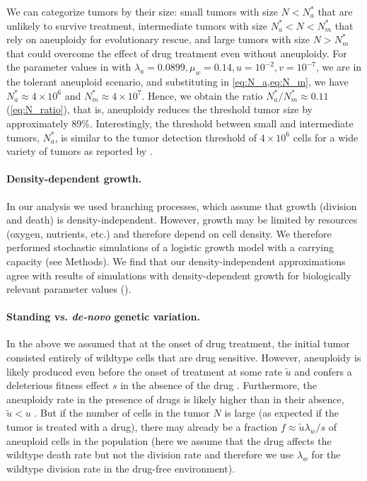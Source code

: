 \documentclass[12pt]{extarticle}
\begin{document}
We can categorize tumors by their size: small tumors with size $N<N_a^*$ that are unlikely to survive treatment, intermediate tumors with size $N_a^* < N < N_m^*$ that rely on aneuploidy for evolutionary rescue, and large tumors with size $N > N_m^*$ that could overcome the effect of drug treatment even without aneuploidy.
For the parameter values in  with $\lambda_a=0.0899,\mu_w=0.14, u=10^{-2}, v=10^{-7}$, we are in the tolerant aneuploid scenario, and substituting in \cref{eq:N_a,eq:N_m}, we have $N_a^* \approx 4 \times 10^6$ and $N_m^* \approx 4 \times 10^7$.
Hence, we obtain the ratio $N^*_a/N^*_m \approx 0.11$ (\cref{eq:N_ratio}), that is, aneuploidy reduces the threshold tumor size by approximately 89\%.
Interestingly, the threshold between small and intermediate tumors, $N_a^*$, is similar to the tumor detection threshold of $4 \times 10^6$ cells for a wide variety of tumors as reported by \citet{avanzini2019cancer}.

\paragraph*{Density-dependent growth.}

In our analysis we used branching processes, which assume that growth (division and death) is density-independent. However, growth may be limited by resources (oxygen, nutrients, etc.) and therefore depend on cell density. 
We therefore performed stochastic simulations of a logistic growth model with a carrying capacity (see Methods). 
We find that our density-independent approximations agree with results of simulations with density-dependent growth for biologically relevant parameter values ().

\paragraph*{Standing vs. \emph{de-novo} genetic variation.}

In the above we assumed that at the onset of drug treatment, the initial tumor consisted entirely of wildtype cells that are drug sensitive.
However, aneuploidy is likely produced even before the onset of treatment at some rate $\tilde{u}$ and confers a deleterious fitness effect $s$ in the absence of the drug \citep{replogle2020aneuploidy,giam2015aneuploidy}. Furthermore, the aneuploidy rate in the presence of drugs is likely higher than in their absence, $\tilde{u} < u$ \citep{wang2019molecular,mason2017functional}.
But if the number of cells in the tumor $N$ is large (as expected if the tumor is treated with a drug), there may already be a fraction $f \approx \tilde{u}\lambda_w/s$ of aneuploid cells in the population (here we assume that the drug affects the wildtype death rate but not the division rate and therefore we use $\lambda_w$ for the wildtype division rate in the drug-free environment).
\end{document}
